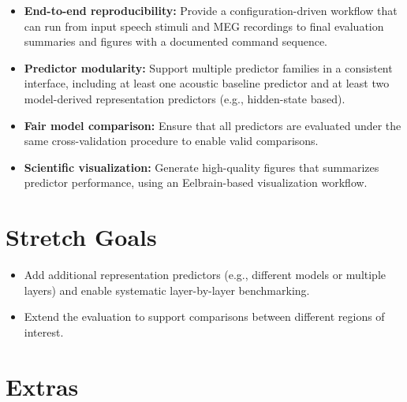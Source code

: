 \documentclass{article}
\begin{document}
\begin{itemize}
  \item \textbf{End-to-end reproducibility:} Provide a configuration-driven
  workflow that can run from input speech stimuli and MEG recordings to final
  evaluation summaries and figures with a documented command sequence.

  \item \textbf{Predictor modularity:} Support multiple predictor families in a
  consistent interface, including at least one acoustic baseline predictor and
  at least two model-derived representation predictors (e.g., hidden-state based).

  \item \textbf{Fair model comparison:} Ensure that all predictors are evaluated
  under the same cross-validation procedure to enable valid comparisons.

  \item \textbf{Scientific visualization:} Generate high-quality figures
  that summarizes predictor performance, using an Eelbrain-based visualization workflow.

\end{itemize}


\section{Stretch Goals}


\begin{itemize}
  \item Add additional representation predictors (e.g., different models or multiple layers) and enable systematic layer-by-layer benchmarking.

  \item Extend the evaluation to support comparisons between different regions of interest.

\end{itemize}


\section{Extras}

\end{document}
